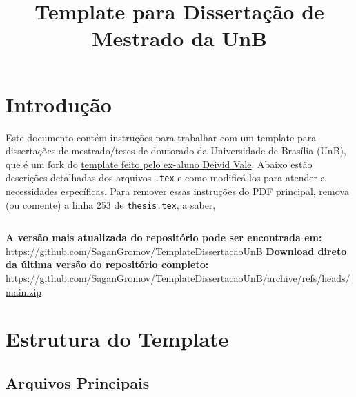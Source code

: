 \documentclass[a4paper,12pt]{article}
\title{Template para Dissertação de Mestrado da UnB}
\author{}
\date{}
\begin{document}
\maketitle

\section*{Introdução}

Este documento contém instruções para trabalhar com um template para dissertações de mestrado/teses de doutorado da Universidade de Brasília (UnB), que é um fork do \href{https://github.com/deividrvale/unb-thesis-template}{template feito pelo ex-aluno Deivid Vale}. Abaixo estão descrições detalhadas dos arquivos \texttt{.tex} e como modificá-los para atender a necessidades específicas. Para remover essas instruções do PDF principal, remova (ou comente) a linha 253 de \texttt{thesis.tex}, a saber,
\begin{verbatim}

\end{verbatim}
{\color{blue}\textbf{A versão mais atualizada do repositório pode ser encontrada em:}} \newline 
\href{https://github.com/SaganGromov/TemplateDissertacaoUnB}{https://github.com/SaganGromov/TemplateDissertacaoUnB}
\newline\newline
{\color{blue}\textbf{Download direto da última versão do repositório completo:}} \newline
\href{https://github.com/SaganGromov/TemplateDissertacaoUnB/archive/refs/heads/main.zip}{https://github.com/SaganGromov/TemplateDissertacaoUnB/archive/refs/heads/main.zip}


\section*{Estrutura do Template}

\subsection*{Arquivos Principais}
\end{document}
